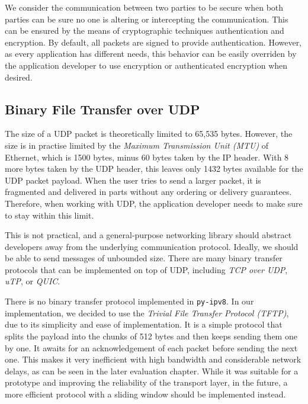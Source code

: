 We consider the communication between two parties to be secure when both parties can be sure no one is altering or intercepting the communication. This can be ensured by the means of cryptographic techniques authentication and encryption. By default, all packets are signed to provide authentication. However, as every application has different needs, this behavior can be easily overriden by the application developer to use encryption or authenticated encryption when desired.

\subsection{Binary File Transfer over UDP}

The size of a UDP packet is theoretically limited to 65,535 bytes. However, the size is in practise limited by the \textit{Maximum Transmission Unit (MTU)} of Ethernet, which is 1500 bytes, minus 60 bytes taken by the IP header. With 8 more bytes taken by the UDP header, this leaves only 1432 bytes available for the UDP packet payload. When the user tries to send a larger packet, it is fragmented and delivered in parts without any ordering or delivery guarantees. Therefore, when working with UDP, the application developer needs to make sure to stay within this limit.

This is not practical, and a general-purpose networking library should abstract developers away from the underlying communication protocol. Ideally, we should be able to send messages of unbounded size. There are many binary transfer protocols that can be implemented on top of UDP, including \textit{TCP over UDP}, \textit{uTP}, or \textit{QUIC}.

There is no binary transfer protocol implemented in \texttt{py-ipv8}. In our implementation, we decided to use the \textit{Trivial File Transfer Protocol (TFTP)}, due to its simplicity and ease of implementation. It is a simple protocol that splits the payload into the chunks of 512 bytes and then keeps sending them one by one. It awaits for an acknowledgement of each packet before sending the next one. This makes it very inefficient with high bandwidth and considerable network delays, as can be seen in the later evaluation chapter. While it was suitable for a prototype and improving the reliability of the transport layer, in the future, a more efficient protocol with a sliding window should be implemented instead.


